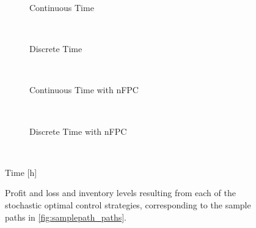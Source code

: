 \begin{figure}%
\centering%
\setlength{}%
\setlength{}%
\begin{subfigure}[b]{\linewidth}%
  \centering%
  \hspace{1.5cm}%
  \caption{Continuous Time}%
\end{subfigure}\\%
\vspace{1cm}%
\begin{subfigure}[b]{\linewidth}%
  \centering
  \hspace{1.5cm}%
  \caption{Discrete Time}%
\end{subfigure}\\%
\vspace{1cm}%
\begin{subfigure}[b]{\linewidth}%
  \centering%
  \hspace{1.5cm}%
  \caption{Continuous Time with nFPC}%
\end{subfigure}\\%
\vspace{1cm}%
\begin{subfigure}[b]{\linewidth}%
  \centering%
  \hspace{1.5cm}%
  \caption{Discrete Time with nFPC}%
\end{subfigure}\\%
\leavevmode{}\hspace{0pt plus 1filll}\null%

Time [h]

\vspace{1cm}%
  \caption[Comparison of P\&L and inventory on the sample path]{Profit and loss and inventory levels resulting from each of the stochastic optimal control strategies, corresponding to the sample paths in \autoref{fig:samplepath_paths}.}\label{fig:samplepath_pnl_inv}%
\end{figure}

